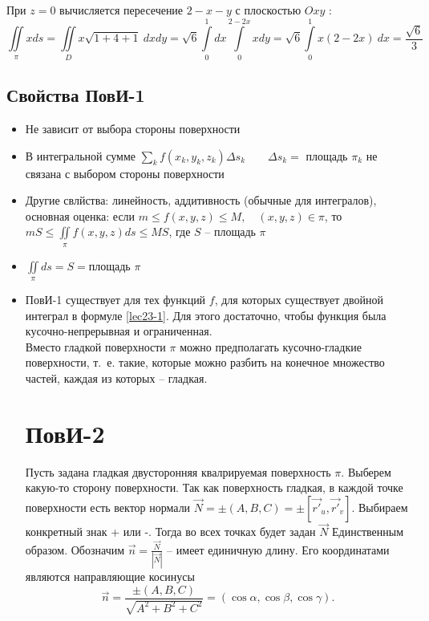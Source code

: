 \documentclass[../../main.tex]{subfiles}
\begin{document}
\begin{exmps}
\begin{enumerate}
	При $z = 0$ вычисляется пересечение $2 -x-y$ с плоскостью $Oxy$ :
	\[\iint \limits_\pi x ds = \iint \limits_D x \sqrt{1 + 4 +1} \  dx dy = 
	\sqrt{6}
	 \int \limits_0^1  dx \int \limits_0^{2 - 2x} x dy = \sqrt 6 \int \limits_0^1 
	 x(2 -2x) \ dx = \frac{\sqrt 6}{3}\] 
	 \end{enumerate}
	\end{exmps}
	\subsection{Свойства ПовИ-1}
	\begin{itemize}
		\item 	Не зависит от выбора стороны поверхности
		\item	В интегральной сумме $\sum\limits_{k} f(x_k, y_k, z_k) \Delta s_k
		 \qquad \Delta s_k = $ площадь $\pi_k$ не связана с выбором стороны 
		 поверхности
		\item Другие свлйства: линейность, аддитивность (обычные для интегралов),
		 основная оценка: если $m \leq f(x, y, z) \leq M, \quad (x, y, z) \in \pi$,
		  то $mS \leq \iint \limits_\pi f(x, y, z) ds \leq MS$, где $S$ \---
		   площадь $\pi$
		\item $\iint \limits_\pi ds  = S = $площадь $\pi$
		\item ПовИ-1 существует для тех функций $f$, для которых существует двойной
		 интеграл в формуле \eqref{lec23-1}. Для этого достаточно, чтобы функция была
		  кусочно-непрерывная и ограниченная.\\
		Вместо гладкой поверхности $\pi$ можно предполагать кусочно-гладкие
		 поверхности, т.~е. такие, которые можно разбить на конечное множество
		  частей, каждая из которых \--- гладкая.\\
		\section{ПовИ-2}
		Пусть задана гладкая двусторонняя квалрируемая поверхность $\pi$. Выберем
		 какую-то сторону поверхности. Так как поверхность гладкая, в каждой точке
		  поверхности есть вектор нормали $\overrightarrow{N} = \pm (A, B,C) = \pm
		   [\overrightarrow{r'}_u, \overrightarrow{r'}_v]$. Выбираем конкретный
		    знак + или -. Тогда во всех точках будет задан $\overrightarrow{N}$
		     Единственным образом. Обозначим $\overrightarrow{n} =
		      \frac{\overrightarrow{N}}{|\overrightarrow{N}|}$ \--- имеет
		       единичную длину. Его координатами являются
		       направляющие косинусы
		\[\overrightarrow{n} = \frac{\pm(A,B,C)}{\sqrt{A^2 +B^2 + C^2}} = 
		(\cos \alpha, \cos \beta, \cos \gamma).\]

\end{itemize}
\end{document}
